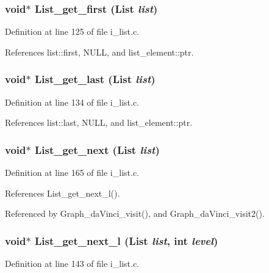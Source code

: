 \subsubsection{\setlength{\rightskip}{0pt plus 5cm}void$\ast$ List\_\-get\_\-first (\bf{List} {\em list})}\label{i__list_8h_8388a8373124b8aa52ad41d5c2aa156b}




Definition at line 125 of file i\_\-list.c.

References list::first, NULL, and list\_\-element::ptr.
\subsubsection{\setlength{\rightskip}{0pt plus 5cm}void$\ast$ List\_\-get\_\-last (\bf{List} {\em list})}\label{i__list_8h_704e244c8b364cf786092d245493d994}




Definition at line 134 of file i\_\-list.c.

References list::last, NULL, and list\_\-element::ptr.
\subsubsection{\setlength{\rightskip}{0pt plus 5cm}void$\ast$ List\_\-get\_\-next (\bf{List} {\em list})}\label{i__list_8h_6e1a5ec1a4d53a46a286632048be2034}




Definition at line 165 of file i\_\-list.c.

References List\_\-get\_\-next\_\-l().

Referenced by Graph\_\-da\-Vinci\_\-visit(), and Graph\_\-da\-Vinci\_\-visit2().
\subsubsection{\setlength{\rightskip}{0pt plus 5cm}void$\ast$ List\_\-get\_\-next\_\-l (\bf{List} {\em list}, int {\em level})}\label{i__list_8h_ba9f38d279f80d663b1a07de417e4d81}




Definition at line 143 of file i\_\-list.c.


